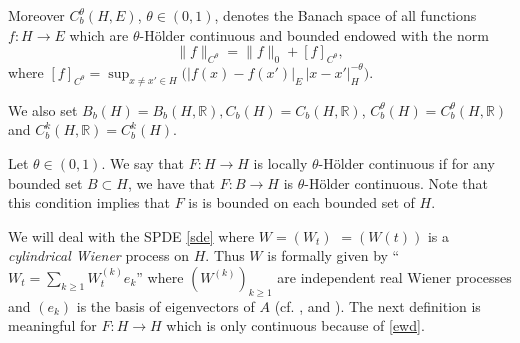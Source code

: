 \documentclass[preprint]{imsart}
\def\R{\mathbb R}
\begin{document}
Moreover $C^{\theta}_b(H,E)$, $\theta \in (0,1)$, denotes the Banach space of all functions $f :H \to E$ which are $\theta$-H\"older continuous and bounded endowed with the norm
\begin{equation}\label{sx}
\| f\|_{C^{\theta}} = \| f\|_0 + [f]_{C^{\theta}},
\end{equation}
where $[f]_{C^{\theta}} =  \displaystyle{ \sup_{x\neq x'\in H}
 {(|f(x)-f(x')|_E}\, {|x-x'|^{-\theta}_H}).}$  
 

We also set $B_b(H) = B_b(H, \R), C_b(H) = C_b(H,\R)$, $C_b^{\theta}(H) = C_b^{\theta}(H, \R)$ and $C^{k}_b (H, \R) = C^{k}_b (H)$.  

Let $\theta \in (0,1)$. We say that $F: H \to H$ is locally $\theta$-H\"older continuous if for any bounded set $B \subset H$, we have that
 $
 F: B \to H
 $
 is $\theta$-H\"older continuous. Note that this condition implies that $F$ is  is  bounded on each bounded set of $H$.
  
 


 
\smallskip   
We  will deal with the SPDE \eqref{sde} 
 where  $W = (W_t)$ $= (W(t))$ is a {\sl cylindrical Wiener} process on $H$.  Thus   
  $W$ is formally given by ``$W_t = \sum_{k \ge 1}
  W^{(k)}_t e_k$'' where  $(W^{(k)})_{k \ge 1}   $   are independent real Wiener processes and   $(e_k)$ is the basis of eigenvectors  of $A$ (cf. \cite{DZ1},  \cite{hairer} and \cite{DZ}).   
 The next definition is meaningful for $F: H \to H$ which is only continuous  because of \eqref{ewd}. 
  
  
\end{document}
